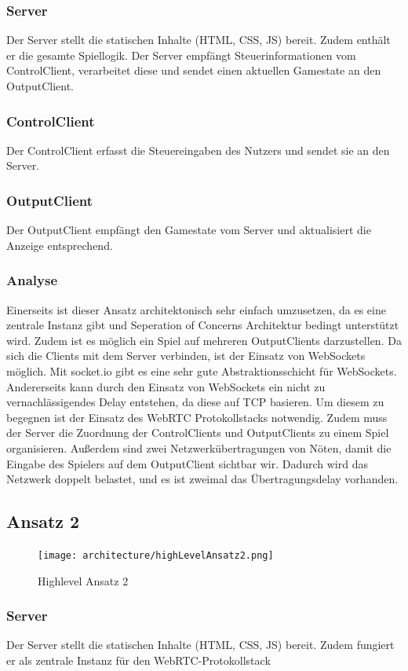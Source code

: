 \subsubsection{Server}
Der Server stellt die statischen Inhalte (HTML, CSS, JS) bereit. Zudem enthält er die gesamte Spiellogik. Der Server empfängt Steuerinformationen vom ControlClient, verarbeitet diese und sendet einen aktuellen Gamestate an den OutputClient.
\subsubsection{ControlClient}
Der ControlClient erfasst die Steuereingaben des Nutzers und sendet sie an den Server.
\subsubsection{OutputClient}
Der OutputClient empfängt den Gamestate vom Server und aktualisiert die Anzeige entsprechend.
\subsubsection{Analyse}
Einerseits ist dieser Ansatz architektonisch sehr einfach umzusetzen, da es eine zentrale Instanz gibt und Seperation of Concerns Architektur bedingt unterstützt wird. Zudem ist es möglich ein Spiel auf mehreren OutputClients darzustellen. Da sich die Clients mit dem Server verbinden, ist der Einsatz von WebSockets möglich. Mit socket.io gibt es eine sehr gute Abstraktionsschicht für WebSockets. Andererseits kann durch den Einsatz von WebSockets ein nicht zu vernachlässigendes Delay entstehen, da diese auf TCP basieren. Um diesem zu begegnen ist der Einsatz des WebRTC Protokollstacks notwendig. Zudem muss der Server die Zuordnung der ControlClients und OutputClients zu einem Spiel organisieren. Außerdem sind zwei Netzwerkübertragungen von Nöten, damit die Eingabe des Spielers auf dem OutputClient sichtbar wir. Dadurch wird das Netzwerk doppelt belastet, und es ist zweimal das Übertragungsdelay vorhanden.
\subsection{Ansatz 2}
\begin{figure}[ht]
	\centering
	\texttt{[image: architecture/highLevelAnsatz2.png]}
	\caption{Highlevel Ansatz 2}
	\label{fig2}
\end{figure}
\subsubsection{Server}
Der Server stellt die statischen Inhalte (HTML, CSS, JS) bereit. Zudem fungiert er als zentrale Instanz für den WebRTC-Protokollstack
